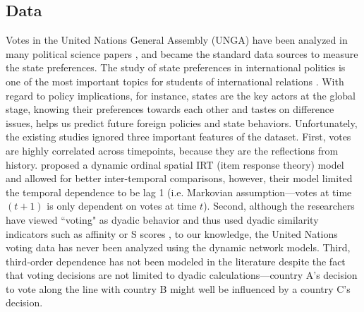 \documentclass[a4paper]{article}
\begin{document}
\subsection{Data}\label{subsec: data processing}
Votes in the United Nations General Assembly (UNGA) have been analyzed in many political science papers \citep{voeten2000clashes,voeten2004resisting,bearce2007intergovernmental,mattes2015leadership,bailey2017estimating}, and became the standard data sources to measure the state preferences. The study of state preferences in international politics is one of the most important topics for students of international relations \citep{wendt_1994}. With regard to policy implications, for instance, states are the key actors at the global stage, knowing their preferences towards each other and tastes on difference issues, helps us predict future foreign policies and state behaviors. 
Unfortunately, the existing studies ignored three important features of the dataset. First, votes are highly correlated across timepoints, because they are the reflections from history. \cite{bailey2017estimating} proposed a dynamic ordinal spatial IRT (item response theory) model and allowed for better inter-temporal comparisons, however, their model limited the temporal dependence to be lag 1 (i.e. Markovian assumption---votes at time $(t+1)$ is only dependent on votes at time $t$). Second, although the researchers have viewed ``voting" as dyadic behavior and thus used dyadic similarity indicators such as affinity or S scores \citep{gartzke1998kant,signorino1999tau}, to our knowledge, the United Nations voting data has never been analyzed using the dynamic network models. Third, third-order dependence has not been modeled in the literature despite the fact that voting decisions are not limited to dyadic calculations---country A's decision to vote along the line with country B might well be influenced by a country C's decision. \\ \newline
\end{document}
